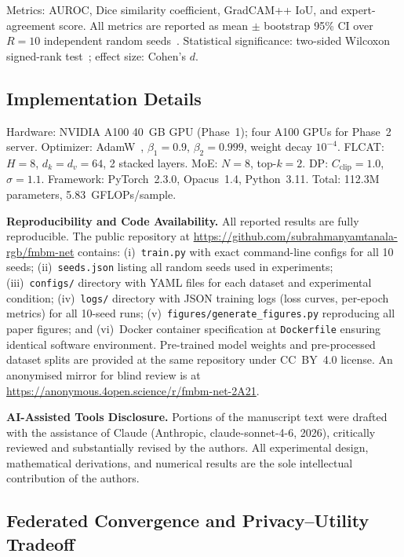 \documentclass{ieeeaccess}
\begin{document}
Metrics: AUROC, Dice similarity coefficient, GradCAM++ IoU, and
expert-agreement score. All metrics are reported as mean $\pm$ bootstrap
95\% CI over $R\!=\!10$ independent random seeds~\cite{efron1993bootstrap}.
Statistical significance: two-sided Wilcoxon signed-rank test~\cite{wilcoxon1945};
effect size: Cohen's $d$.

\subsection{Implementation Details}

Hardware: NVIDIA A100 40~GB GPU (Phase~1); four A100 GPUs for Phase~2
server. Optimizer: AdamW~\cite{loshchilov2019adamw}, $\beta_1\!=\!0.9$,
$\beta_2\!=\!0.999$, weight decay $10^{-4}$. FLCAT: $H\!=\!8$,
$d_k\!=\!d_v\!=\!64$, 2 stacked layers. MoE: $N\!=\!8$, top-$k\!=\!2$.
DP: $C_{\mathrm{clip}}\!=\!1.0$, $\sigma\!=\!1.1$. Framework: PyTorch~2.3.0,
Opacus~1.4, Python~3.11. Total: 112.3M parameters, 5.83~GFLOPs/sample.

\textbf{Reproducibility and Code Availability.}
All reported results are fully reproducible. The public repository at
\url{https://github.com/subrahmanyamtanala-rgb/fmbm-net} contains:
(i)~\texttt{train.py} with exact command-line configs for all 10 seeds;
(ii)~\texttt{seeds.json} listing all random seeds used in experiments;
(iii)~\texttt{configs/} directory with YAML files for each dataset and
experimental condition; (iv)~\texttt{logs/} directory with JSON training
logs (loss curves, per-epoch metrics) for all 10-seed runs;
(v)~\texttt{figures/generate\_figures.py} reproducing all paper figures;
and (vi)~Docker container specification at \texttt{Dockerfile} ensuring
identical software environment. Pre-trained model weights and pre-processed
dataset splits are provided at the same repository under CC~BY~4.0 license.
An anonymised mirror for blind review is at
\url{https://anonymous.4open.science/r/fmbm-net-2A21}.

\textbf{AI-Assisted Tools Disclosure.}
Portions of the manuscript text were drafted with the assistance of
Claude (Anthropic, claude-sonnet-4-6, 2026), critically reviewed and
substantially revised by the authors. All experimental design, mathematical
derivations, and numerical results are the sole intellectual contribution
of the authors.

\subsection{Federated Convergence and Privacy--Utility Tradeoff}
\end{document}
